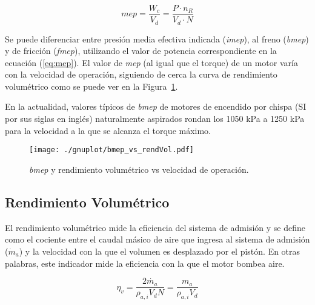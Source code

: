 \begin{equation}\label{eq:mep}
  mep = \frac{W_{c}}{V_d} = \frac{P \cdot n_R}{V_d \cdot N}
\end{equation}
%

Se puede diferenciar entre presión media efectiva indicada (\emph{imep}), al
freno (\emph{bmep}) y de fricción (\emph{fmep}), utilizando el valor de potencia
correspondiente en la ecuación (\ref{eq:mep}).
%
El valor de \emph{mep} (al igual que el torque) de un motor varía con la
velocidad de operación, siguiendo de cerca la curva de rendimiento volumétrico
como se puede ver en la Figura~\ref{fig:bmep_tipica}.

En la actualidad, valores típicos de \emph{bmep} de motores de encendido por
chispa (SI por sus siglas en inglés) naturalmente aspirados rondan los 1050 kPa
a 1250 kPa para la velocidad a la que se alcanza el torque máximo.

\begin{figure} \centering
\texttt{[image: ./gnuplot/bmep\_vs\_rendVol.pdf]}
    \caption{\emph{bmep} y rendimiento volumétrico vs velocidad de operación.}
    \label{fig:bmep_tipica}
\end{figure}



\subsection{Rendimiento Volumétrico}
%
El rendimiento volumétrico mide la eficiencia del sistema de admisión y se
define como el cociente entre el caudal másico de aire que ingresa al sistema de
admisión ($\dot{m}_{a}$) y la velocidad con la que el volumen es desplazado por
el pistón.
%
En otras palabras, este indicador mide la eficiencia con la que el motor bombea
aire.

\begin{equation}\label{eq:eta_v}
  \eta_v = \frac{2\dot{m_a}}{\rho_{a,i}V_d N} = \frac{m_a}{\rho_{a,i}V_d}
\end{equation}

